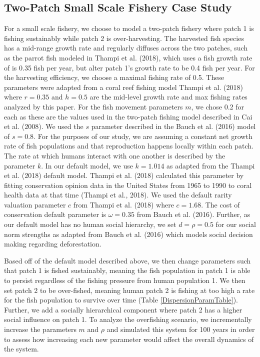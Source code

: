 \documentclass[
  12pt,
]{article}
\begin{document}
\subsection{\texorpdfstring{ Two-Patch Small Scale Fishery Case Study}{ Two-Patch Small Scale Fishery Case Study}}\label{two-patch-small-scale-fishery-case-study}

For a small scale fishery, we choose to model a two-patch fishery where patch 1 is fishing sustainably while patch 2 is over-harvesting. The harvested fish species has a mid-range growth rate and regularly diffuses across the two patches, such as the parrot fish modeled in Thampi et al. (2018), which uses a fish growth rate of is 0.35 fish per year, but alter patch 1's growth rate to be 0.4 fish per year. For the harvesting efficiency, we choose a maximal fishing rate of 0.5. These parameters were adapted from a coral reef fishing model Thampi et al. (2018) where \(r = 0.35\) and \(h = 0.5\) are the mid-level growth rate and max fishing rates analyzed by this paper. For the fish movement parameters \(m\), we chose 0.2 for each as these are the values used in the two-patch fishing model described in Cai et al. (2008). We used the \(s\) parameter described in the Bauch et al. (2016) model of \(s = 0.8\). For the purposes of our study, we are assuming a constant net growth rate of fish populations and that reproduction happens locally within each patch. The rate at which humans interact with one another is described by the parameter \(k\). In our default model, we use \(k = 1.014\) as adapted from the Thampi et al. (2018) default model. Thampi et al. (2018) calculated this parameter by fitting conservation opinion data in the United States from 1965 to 1990 to coral health data at that time (Thampi et al., 2018). We used the default rarity valuation parameter \(c\) from Thampi et al. (2018) where \(c = 1.68\). The cost of conservation default parameter is \(\omega = 0.35\) from Bauch et al. (2016). Further, as our default model has no human social hierarchy, we set \(d = \rho = 0.5\) for our social norm strengths as adapted from Bauch et al. (2016) which models social decision making regarding deforestation.

Based off of the default model described above, we then change parameters such that patch 1 is fished sustainably, meaning the fish population in patch 1 is able to persist regardless of the fishing pressure from human population 1. We then set patch 2 to be over-fished, meaning human patch 2 is fishing at too high a rate for the fish population to survive over time (Table \ref{DispersionParamTable}). Further, we add a socially hierarchical component where patch 2 has a higher social influence on patch 1. To analyze the overfishing scenario, we incrementally increase the parameters \(m\) and \(\rho\) and simulated this system for 100 years in order to assess how increasing each new parameter would affect the overall dynamics of the system.
\end{document}
